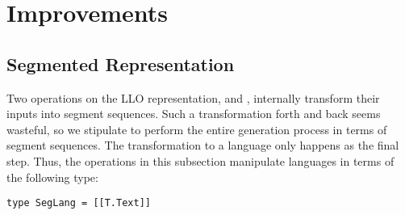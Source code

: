 \section{Improvements}
\label{sec:improvements}

\subsection{Segmented Representation}
\label{sec:segm-repr}

Two operations on the LLO representation,  and
, internally transform their inputs into segment
sequences. Such a transformation forth and back seems wasteful, so we
stipulate to perform the entire generation process in terms of segment
sequences. The transformation to a language only happens as the final
step. Thus, the operations in this subsection manipulate languages in
terms of the following type:
\begin{lstlisting}[numbers=none]
type SegLang = [[T.Text]]
\end{lstlisting}

